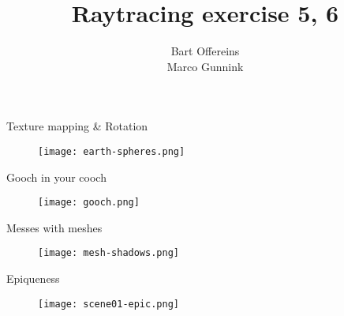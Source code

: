\documentclass{beamer}
\author{Bart Offereins\\Marco Gunnink}
\title{Raytracing exercise 5, 6}
\begin{document}
\titlepage

\begin{frame}{Texture mapping \& Rotation}

\begin{figure}[ht]
	\texttt{[image: earth-spheres.png]}
\end{figure}

\end{frame}

\begin{frame}{Gooch in your cooch}

\begin{figure}[ht]
	\texttt{[image: gooch.png]}
\end{figure}


\end{frame}

\begin{frame}{Messes with meshes}

\begin{figure}[ht]
	\texttt{[image: mesh-shadows.png]}
\end{figure}


\end{frame}

\begin{frame}{Epiqueness}

\begin{figure}[ht]
	\texttt{[image: scene01-epic.png]}
\end{figure}

\end{frame}
\end{document}

